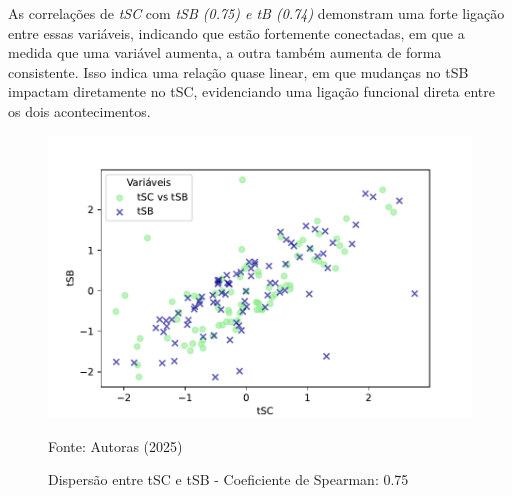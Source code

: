 As correlações de \textit{tSC} com \textit{tSB (0.75) e tB (0.74)} demonstram uma forte ligação entre essas variáveis, indicando que estão fortemente conectadas, em que a medida que uma variável aumenta, a outra também aumenta de forma consistente. Isso indica uma relação quase linear, em que mudanças no tSB impactam diretamente no tSC, evidenciando uma ligação funcional direta entre os dois acontecimentos.

\begin{figure}[h]
    \captionsetup{font=footnotesize, justification=centering, labelsep=period, position=above}
    \centering
    \begin{minipage}[b]{0.45\linewidth}
        \label{fig:tSC-tSB}
        \centering
        \includegraphics[scale=0.35]{figuras/Spearman/tSC-tSB.pdf}
        \caption{Dispersão entre tSC e tSB - Coeficiente de Spearman: 0.75}
        \vspace{0.3cm}
        \begin{minipage}{\linewidth}
            \centering
            \scriptsize{Fonte: Autoras (2025)}
        \end{minipage}
    \end{minipage}
    \hspace{0.05\linewidth}
    \begin{minipage}[b]{0.45\linewidth}
        \label{fig:tSC-tB}
        \centering

\end{minipage}
\end{figure}
